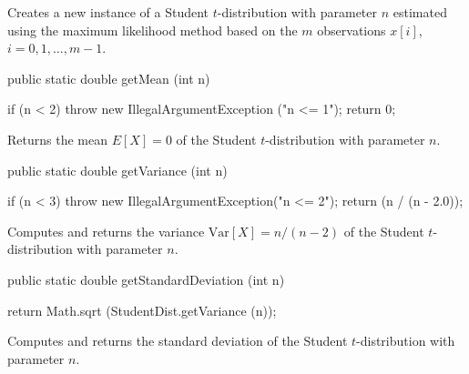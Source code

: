 \begin{tabb}
   Creates a new instance of a Student $t$-distribution with parameter $n$
   estimated using the maximum likelihood method based on the $m$ observations
   $x[i]$, $i = 0, 1, \ldots, m-1$.
\end{tabb}
\begin{htmlonly}
\end{htmlonly}
\begin{code}

   public static double getMean (int n)\begin{hide} {
     if (n < 2)
        throw new IllegalArgumentException ("n <= 1");
      return 0;
   }\end{hide}
\end{code}
\begin{tabb} Returns the mean $E[X] = 0$ of the Student $t$-distribution with
 parameter $n$.
\end{tabb}
\begin{htmlonly}
\end{htmlonly}
\begin{code}

   public static double getVariance (int n)\begin{hide} {
      if (n < 3)
         throw new IllegalArgumentException("n <= 2");
      return (n / (n - 2.0));
   }\end{hide}
\end{code}
\begin{tabb}  Computes and returns the variance $\mbox{Var}[X] = n/(n - 2)$
   of the Student $t$-distribution with parameter $n$.
\end{tabb}
\begin{htmlonly}
\end{htmlonly}
\begin{code}

   public static double getStandardDeviation (int n)\begin{hide} {
      return Math.sqrt (StudentDist.getVariance (n));
   }\end{hide}
\end{code}
\begin{tabb}  Computes and returns the standard deviation
   of the Student $t$-distribution with parameter $n$.
\end{tabb}

